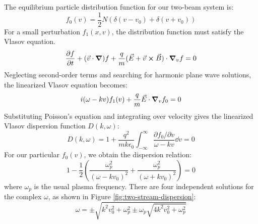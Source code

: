 \documentclass[%
 reprint,
 amsmath,amssymb,
 aps,
]{revtex4-2}
\begin{document}
The equilibrium particle distribution function for our two-beam system is:
\begin{equation}
f_0 (v) = \frac{1}{2}N \left( \delta(v - v_0) + \delta(v + v_0) \right)
\end{equation}
For a small perturbation $f_1(x, v)$, the distribution function must satisfy the Vlasov equation.
\begin{equation}
\pdv{f}{t} + ( \vec v \cdot \grad)f + \frac{q}{m}(\vec E + \vec v \cross \vec B) \cdot \grad _v f = 0
\end{equation}
Neglecting second-order terms and searching for harmonic plane wave solutions, the linearized Vlasov equation becomes:
\begin{equation}
i (\omega - k v )f_1(v) + \frac{q}{m} \vec E \cdot \grad_v f_0 = 0
\end{equation}
Substituting Poisson's equation and integrating over velocity gives the linearized Vlasov dispersion function $D(k, \omega)$:
\begin{equation}
D(k, \omega) = 1 + \frac{q^2}{m k \epsilon_0} \int_{-\infty} ^{\infty} \frac{\partial f_0 / \partial v}{\omega - k v} \dd v = 0
\end{equation}
For our particular $f_0(v)$, we obtain the dispersion relation:
\begin{equation}
1 - \frac{1}{2} \left( \frac{\omega_p ^2}{(\omega - k v_0)^2} + \frac{\omega_p ^2}{(\omega + k v_0)^2}\right) = 0
\end{equation}
where $\omega_p$ is the usual plasma frequency. There are four independent solutions for the complex $\omega$, as shown in Figure \ref{fig:two-stream-dispersion}:
\begin{equation}
\omega = \pm \sqrt{k^2 v_0 ^2 + \omega_p ^2 \pm \omega_p \sqrt{4 k^2 v_0 ^2 + \omega_p ^2}}
\end{equation}
\end{document}
